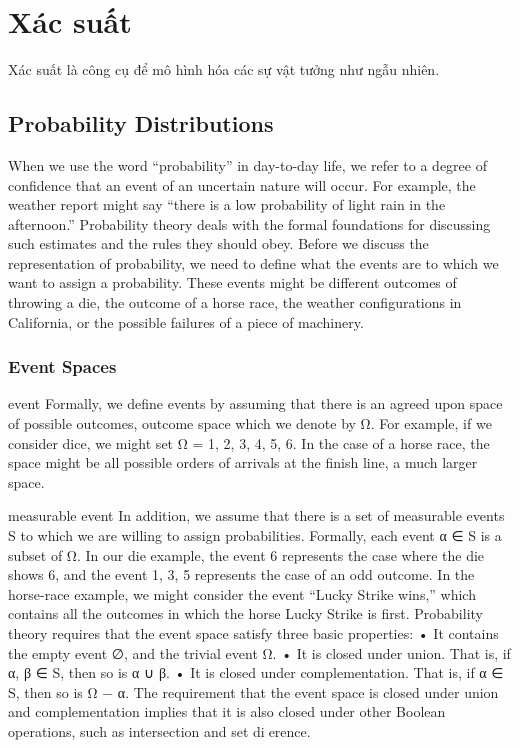 \chapter{Xác suất}


Xác suất là công cụ để mô hình hóa các sự vật tưởng như ngẫu nhiên.


\section{Probability Distributions}

When we use the word “probability” in day-to-day life, we refer to a degree of confidence that an event of an uncertain nature will occur. For example, the weather report might say “there is a low probability of light rain in the afternoon.” Probability theory deals with the formal foundations for discussing such estimates and the rules they should obey. Before we discuss the representation of probability, we need to define what the events are to which we want to assign a probability. These events might be different outcomes of throwing a die, the outcome of a horse race, the weather configurations in California, or the possible failures of a piece of machinery.

\subsection{Event Spaces}

event Formally, we define events by assuming that there is an agreed upon space of possible outcomes, outcome space which we denote by Ω. For example, if we consider dice, we might set Ω = {1, 2, 3, 4, 5, 6}. In the case of a horse race, the space might be all possible orders of arrivals at the finish line, a much larger space.

measurable event In addition, we assume that there is a set of measurable events S to which we are willing to assign probabilities. Formally, each event α ∈ S is a subset of Ω. In our die example, the event {6} represents the case where the die shows 6, and the event {1, 3, 5} represents the case of an odd outcome. In the horse-race example, we might consider the event “Lucky Strike wins,” which contains all the outcomes in which the horse Lucky Strike is first. Probability theory requires that the event space satisfy three basic properties: • It contains the empty event ∅, and the trivial event Ω. • It is closed under union. That is, if α, β ∈ S, then so is α ∪ β. • It is closed under complementation. That is, if α ∈ S, then so is Ω − α. The requirement that the event space is closed under union and complementation implies that it is also closed under other Boolean operations, such as intersection and set dierence.

